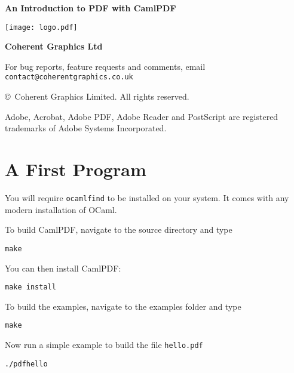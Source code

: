 \documentclass[a4paper]{memoir}
\newcommand{\smallgap}{\vspace{4mm}}
\begin{document}
\frontmatter
\thispagestyle{empty}

\begin{flushright}

{\sffamily \bfseries \Huge An Introduction to PDF with CamlPDF}

\vspace{3mm}

\vfill

\texttt{[image: logo.pdf]}

\vspace{2mm}
{\sffamily \bfseries \LARGE Coherent Graphics Ltd}

\end{flushright}

\clearpage

\thispagestyle{empty}
\noindent For bug reports, feature requests and comments, email\\ \texttt{contact@coherentgraphics.co.uk}

\vspace*{\fill}
\noindent\copyright\ Coherent Graphics Limited. All rights reserved.

\smallgap 
\noindent Adobe, Acrobat, Adobe PDF, Adobe Reader and PostScript are
registered trademarks of Adobe Systems Incorporated.

\cleardoublepage

\mainmatter

\pagestyle{ruled}
\section*{A First Program}
You will require \texttt{ocamlfind} to be installed on your system. It comes with any modern installation of OCaml.

To build \textsf{CamlPDF}, navigate to the source directory and type
\begin{framed}
\verb!make!
\end{framed}

\noindent You can then install \textsf{CamlPDF}:
\begin{framed}
\verb!make install!
\end{framed}


\noindent To build the examples, navigate to the examples folder and type
\begin{framed}
\verb!make!
\end{framed}
\noindent Now run a simple example to build the file \verb!hello.pdf!
\begin{framed}
\verb!./pdfhello!
\end{framed}
\end{document}
